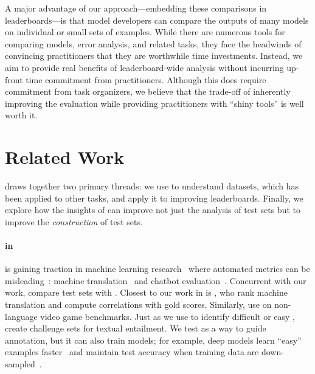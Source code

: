 A major advantage of our approach---embedding these comparisons in leaderboards---is that model developers can compare the outputs of many models on individual or small sets of examples.
While there are numerous tools for comparing models, error analysis, and related tasks, they face the headwinds of convincing practitioners that they are worthwhile time investments.
Instead, we aim to provide real benefits of leaderboard-wide analysis without incurring up-front time commitment from practitioners.
Although this does require commitment from task organizers, we believe that the trade-off of inherently improving the evaluation while providing practitioners with ``shiny tools'' is well worth it.
\section{Related Work}
\label{ch:isicle:rel}

\name{} draws together two primary threads: we use \irt{} to
understand datasets, which has been applied to other  tasks,
and apply it to improving leaderboards.
Finally, we explore how the insights of \irt{} can improve not just
the analysis of test sets but to improve the \emph{construction} of
test sets.

\paragraph{\textbf{ in }}
\irt{} is gaining traction in machine learning
research~\citep{martinez2016ml,martinez2019irt} where automated metrics can be
misleading~\citep{sedoc2019chateval}: machine
translation~\citep{hopkins2013competitions} and chatbot
evaluation~\citep{sedoc2020irt}.
Concurrent with our work, \citet{vania2021compare} compare \nlp{} test sets with \irt{}.
Closest to our work in \nlp{} is \citet{otani2016aggregation}, who
rank machine translation \subjs{} and compute correlations with gold
scores.  Similarly, \citet{martinez2020indicators} use \irt{} on
non-language  video game benchmarks.
Just as we use \irt{} to identify difficult or easy \itms{},
\citet{lalor2016irt} create challenge sets for textual entailment.
We
test \irt{} as a way to guide annotation, but it can also
train \nlp{} models; for example, deep models learn ``easy'' examples
faster~\citep{lalor2018diff} and maintain test accuracy when training
data are down-sampled~\citep{lalor2019latent}.

